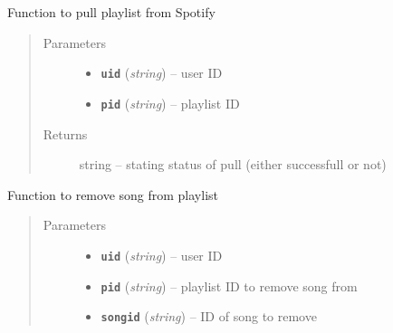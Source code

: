 \documentclass[letterpaper,10pt,english]{sphinxmanual}
\begin{document}
\begin{fulllineitems}
\begin{fulllineitems}
\begin{quote}
\begin{description}
\end{description}\end{quote}

\end{fulllineitems}


\begin{fulllineitems}
\label{code:gitsound.SpotifyUser.pull_spotify_playlist}
Function to pull playlist from Spotify
\begin{quote}\begin{description}
\item[{Parameters}] \leavevmode\begin{itemize}
\item {} 
\textbf{\texttt{uid}} (\emph{string}) -- user ID

\item {} 
\textbf{\texttt{pid}} (\emph{string}) -- playlist ID

\end{itemize}

\item[{Returns}] \leavevmode
string -- stating status of pull (either successfull or not)

\end{description}\end{quote}

\end{fulllineitems}


\begin{fulllineitems}
\label{code:gitsound.SpotifyUser.remove_song_from_playlist}
Function to remove song from playlist
\begin{quote}\begin{description}
\item[{Parameters}] \leavevmode\begin{itemize}
\item {} 
\textbf{\texttt{uid}} (\emph{string}) -- user ID

\item {} 
\textbf{\texttt{pid}} (\emph{string}) -- playlist ID to remove song from

\item {} 
\textbf{\texttt{songid}} (\emph{string}) -- ID of song to remove


\end{itemize}
\end{description}
\end{quote}
\end{fulllineitems}
\end{fulllineitems}
\end{document}
